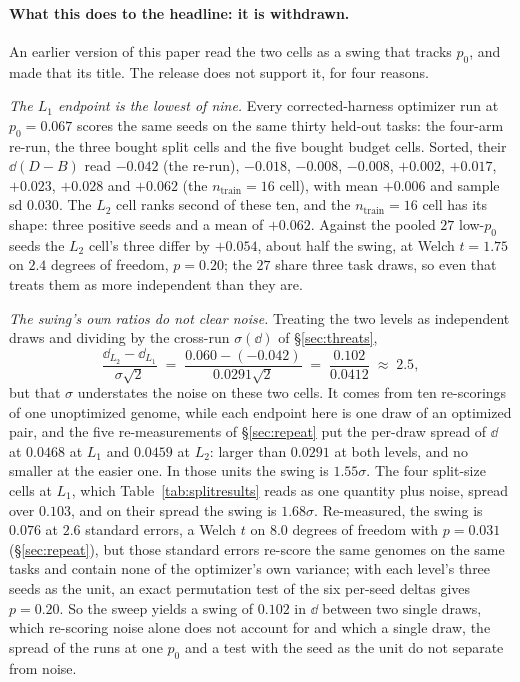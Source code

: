 \documentclass[11pt]{article}
\begin{document}
\paragraph{What this does to the headline: it is withdrawn.} An earlier version of this paper
read the two cells as a swing that tracks $p_0$, and made that its title. The release does not
support it, for four reasons.

\emph{The $L_1$ endpoint is the lowest of nine.} Every corrected-harness optimizer run at
$p_0 = 0.067$ scores the same seeds on the same thirty held-out tasks: the four-arm re-run, the
three bought split cells and the five bought budget cells. Sorted, their $\dd(D-B)$ read
$-0.042$ (the re-run), $-0.018$, $-0.008$, $-0.008$, $+0.002$, $+0.017$, $+0.023$, $+0.028$ and
$+0.062$ (the $n_{\mathrm{train}} = 16$ cell), with mean $+0.006$ and sample sd $0.030$. The
$L_2$ cell ranks second of these ten, and the $n_{\mathrm{train}} = 16$ cell has its shape:
three positive seeds and a mean of $+0.062$. Against the pooled $27$ low-$p_0$ seeds the $L_2$
cell's three differ by $+0.054$, about half the swing, at Welch $t = 1.75$ on $2.4$ degrees of
freedom, $p = 0.20$; the $27$ share three task draws, so even that treats them as more
independent than they are.

\emph{The swing's own ratios do not clear noise.} Treating the two levels as independent draws
and dividing by the cross-run $\sigma(\dd)$ of \S\ref{sec:threats},
\[
\frac{\dd_{L_2} - \dd_{L_1}}{\sigma\sqrt{2}}
 \;=\; \frac{0.060 - (-0.042)}{0.0291\sqrt{2}} \;=\; \frac{0.102}{0.0412} \;\approx\; 2.5 ,
\]
but that $\sigma$ understates the noise on these two cells. It comes from ten re-scorings of one
unoptimized genome, while each endpoint here is one draw of an optimized pair, and the five
re-measurements of \S\ref{sec:repeat} put the per-draw spread of $\dd$ at $0.0468$ at $L_1$ and
$0.0459$ at $L_2$: larger than $0.0291$ at both levels, and no smaller at the easier one. In
those units the swing is $1.55\sigma$. The four split-size cells at $L_1$, which
Table~\ref{tab:splitresults} reads as one quantity plus noise, spread over $0.103$, and on their
spread the swing is $1.68\sigma$. Re-measured, the swing is $0.076$ at $2.6$ standard errors, a
Welch $t$ on $8.0$ degrees of freedom with $p = 0.031$ (\S\ref{sec:repeat}), but those standard
errors re-score the same genomes on the same tasks and contain none of the optimizer's own
variance; with each level's three seeds as the unit, an exact permutation test of the six
per-seed deltas gives $p = 0.20$. So the sweep yields a swing of $0.102$ in $\dd$ between two
single draws, which re-scoring noise alone does not account for and which a single draw, the
spread of the runs at one $p_0$ and a test with the seed as the unit do not separate from noise.
\end{document}
